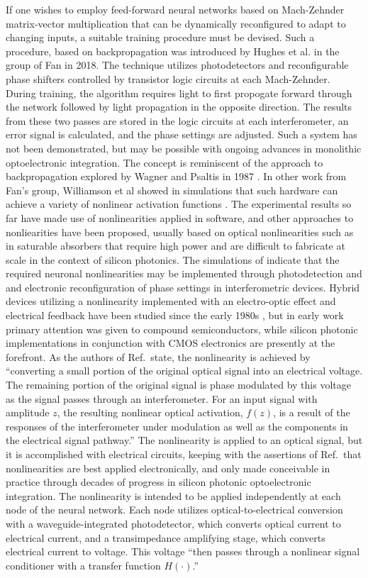 If one wishes to employ feed-forward neural networks based on Mach-Zehnder matrix-vector multiplication that can be dynamically reconfigured to adapt to changing inputs, a suitable training procedure must be devised. Such a procedure, based on backpropagation was introduced by Hughes et al. in the group of Fan in 2018. The technique utilizes photodetectors and reconfigurable phase shifters controlled by transistor logic circuits at each Mach-Zehnder. During training, the algorithm requires light to first propogate forward through the network followed by light propagation in the opposite direction. The results from these two passes are stored in the logic circuits at each interferometer, an error signal is calculated, and the phase settings are adjusted. Such a system has not been demonstrated, but may be possible with ongoing advances in monolithic optoelectronic integration. The concept is reminiscent of the approach to backpropagation explored by Wagner and Psaltis in 1987 \cite{waps1987}. In other work from Fan's group, Williamson et al showed in simulations that such hardware can achieve a variety of nonlinear activation functions \cite{wihu2019}. The experimental results so far \cite{shha2017} have made use of nonlinearities applied in software, and other approaches to nonliearities have been proposed, usually based on optical nonlinearities such as in saturable absorbers that require high power and are difficult to fabricate at scale in the context of silicon photonics. The simulations of \cite{wihu2019} indicate that the required neuronal nonlinearities may be implemented through photodetection and and electronic reconfiguration of phase settings in interferometric devices. Hybrid devices utilizing a nonlinearity implemented with an electro-optic effect and electrical feedback have been studied since the early 1980s \cite{sm1980,ko1981}, but in early work primary attention was given to compound semiconductors, while silicon photonic implementations in conjunction with CMOS electronics are presently at the forefront. As the authors of Ref.\,\cite{wihu2019} state, the nonlinearity is achieved by ``converting a small portion of the original optical signal into an electrical voltage. The remaining portion of the original signal is phase modulated by this voltage as the signal passes through an interferometer. For an input signal with amplitude $z$, the resulting nonlinear optical activation, $f(z)$, is a result of the responses of the interferometer under modulation as well as the components in the electrical signal pathway.'' The nonlinearity is applied to an optical signal, but it is accomplished with electrical circuits, keeping with the assertions of Ref.\,\cite{juyu1996} that nonlinearities are best applied electronically, and only made conceivable in practice through decades of progress in silicon photonic optoelectronic integration. The nonlinearity is intended to be applied independently at each node of the neural network. Each node utilizes optical-to-electrical conversion with a waveguide-integrated photodetector, which converts optical current to electrical current, and a transimpedance amplifying stage, which converts electrical current to voltage. This voltage ``then passes through a nonlinear signal conditioner with a transfer function $H(\cdot)$.'' 